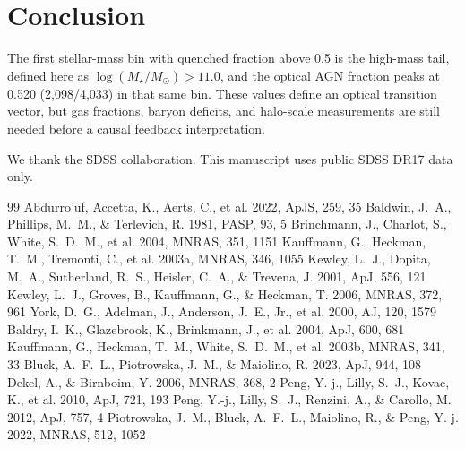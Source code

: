 \documentclass[twocolumn]{aastex631}
\begin{document}
\section{Conclusion}\label{sec:conclusion}
The first stellar-mass bin with quenched fraction above 0.5 is the high-mass tail, defined here as $\log(M_\star/M_\odot)>11.0$, and the optical AGN fraction peaks at 0.520 (2,098/4,033) in that same bin. These values define an optical transition vector, but gas fractions, baryon deficits, and halo-scale measurements are still needed before a causal feedback interpretation.

\begin{acknowledgments}
We thank the SDSS collaboration. This manuscript uses public SDSS DR17 data only.
\end{acknowledgments}
\begin{thebibliography}{99}
 Abdurro'uf, Accetta, K., Aerts, C., et al. 2022, ApJS, 259, 35
 Baldwin, J.~A., Phillips, M.~M., \& Terlevich, R. 1981, PASP, 93, 5
 Brinchmann, J., Charlot, S., White, S.~D.~M., et al. 2004, MNRAS, 351, 1151
 Kauffmann, G., Heckman, T.~M., Tremonti, C., et al. 2003a, MNRAS, 346, 1055
 Kewley, L.~J., Dopita, M.~A., Sutherland, R.~S., Heisler, C.~A., \& Trevena, J. 2001, ApJ, 556, 121
 Kewley, L.~J., Groves, B., Kauffmann, G., \& Heckman, T. 2006, MNRAS, 372, 961
 York, D.~G., Adelman, J., Anderson, J.~E., Jr., et al. 2000, AJ, 120, 1579
 Baldry, I.~K., Glazebrook, K., Brinkmann, J., et al. 2004, ApJ, 600, 681
 Kauffmann, G., Heckman, T.~M., White, S.~D.~M., et al. 2003b, MNRAS, 341, 33
 Bluck, A.~F.~L., Piotrowska, J.~M., \& Maiolino, R. 2023, ApJ, 944, 108
 Dekel, A., \& Birnboim, Y. 2006, MNRAS, 368, 2
 Peng, Y.-j., Lilly, S.~J., Kovac, K., et al. 2010, ApJ, 721, 193
 Peng, Y.-j., Lilly, S.~J., Renzini, A., \& Carollo, M. 2012, ApJ, 757, 4
 Piotrowska, J.~M., Bluck, A.~F.~L., Maiolino, R., \& Peng, Y.-j. 2022, MNRAS, 512, 1052
\end{thebibliography}
\end{document}

